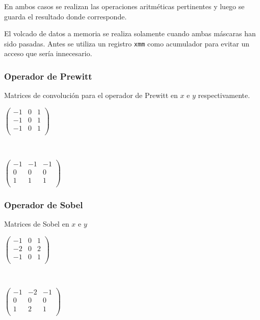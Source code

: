 En ambos casos se realizan las operaciones aritméticas pertinentes y luego se guarda el resultado donde corresponde. 

El volcado de datos a memoria se realiza solamente cuando ambas máscaras han sido pasadas. Antes se utiliza un registro \texttt{xmm} como acumulador para evitar un acceso que sería innecesario.







\subsubsection{Operador de Prewitt}

Matrices de convolución para el operador de Prewitt en $x$ e $y$ respectivamente.

\begin{center}
\begin{minipage}{0.30 \textwidth}
$\begin{pmatrix}
-1 & 0 & 1 \\
-1 & 0 & 1 \\
-1 & 0 & 1 \\
\end{pmatrix}$
\end{minipage}
\ \ 
 \begin{minipage}{0.30 \textwidth}
$\begin{pmatrix}
-1 & -1 & -1 \\
0 & 0 & 0  \\
1 & 1 & 1 \\
\end{pmatrix}$
\end{minipage}
\end{center}

\subsubsection{Operador de Sobel}

Matrices de Sobel en $x$ e $y$

\begin{center}
\begin{minipage}{0.30 \textwidth}
$\begin{pmatrix}
-1 & 0 & 1 \\
-2 & 0 & 2 \\
-1 & 0 & 1 \\
\end{pmatrix}$
\end{minipage}
\ \ 
 \begin{minipage}{0.30 \textwidth}
$\begin{pmatrix}
-1 & -2 & -1 \\
0 & 0 & 0  \\
1 & 2 & 1 \\
\end{pmatrix}$
\end{minipage}
\end{center}

